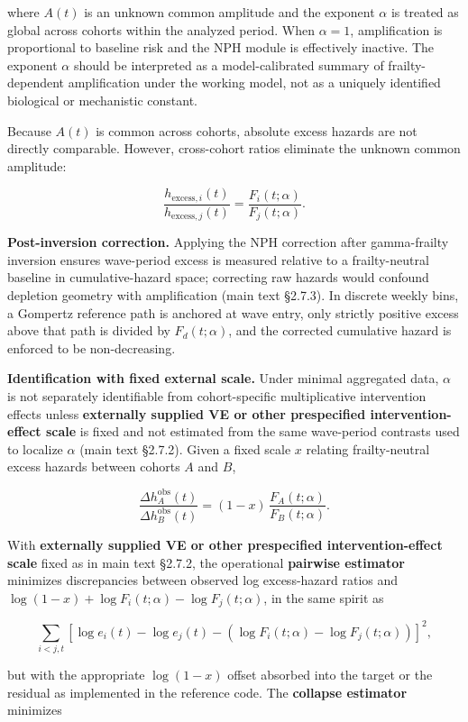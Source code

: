 \documentclass[
]{article}
\begin{document}
where \(A(t)\) is an unknown common amplitude and the exponent
\(\alpha\) is treated as global across cohorts within the analyzed
period. When \(\alpha=1\), amplification is proportional to baseline
risk and the NPH module is effectively inactive. The exponent \(\alpha\)
should be interpreted as a model-calibrated summary of frailty-dependent
amplification under the working model, not as a uniquely identified
biological or mechanistic constant.

Because \(A(t)\) is common across cohorts, absolute excess hazards are
not directly comparable. However, cross-cohort ratios eliminate the
unknown common amplitude:

\[
\frac{h_{\mathrm{excess},i}(t)}{h_{\mathrm{excess},j}(t)}
=
\frac{F_i(t;\alpha)}{F_j(t;\alpha)}.
\]

\textbf{Post-inversion correction.} Applying the NPH correction after
gamma-frailty inversion ensures wave-period excess is measured relative
to a frailty-neutral baseline in cumulative-hazard space; correcting raw
hazards would confound depletion geometry with amplification (main text
§2.7.3). In discrete weekly bins, a Gompertz reference path is anchored
at wave entry, only strictly positive excess above that path is divided
by \(F_d(t;\alpha)\), and the corrected cumulative hazard is enforced to
be non-decreasing.

\textbf{Identification with fixed external scale.} Under minimal
aggregated data, \(\alpha\) is not separately identifiable from
cohort-specific multiplicative intervention effects unless
\textbf{externally supplied VE or other prespecified intervention-effect
scale} is fixed and not estimated from the same wave-period contrasts
used to localize \(\alpha\) (main text §2.7.2). Given a fixed scale
\(x\) relating frailty-neutral excess hazards between cohorts \(A\) and
\(B\),

\[
\frac{\Delta h_A^{\mathrm{obs}}(t)}{\Delta h_B^{\mathrm{obs}}(t)}
=
(1-x)\,\frac{F_A(t;\alpha)}{F_B(t;\alpha)}.
\]

With \textbf{externally supplied VE or other prespecified
intervention-effect scale} fixed as in main text §2.7.2, the operational
\textbf{pairwise estimator} minimizes discrepancies between observed log
excess-hazard ratios and
\(\log(1-x)+\log F_i(t;\alpha)-\log F_j(t;\alpha)\), in the same spirit
as

\[
\sum_{i<j,t}
\left[
\log e_i(t)-\log e_j(t)
-\left(\log F_i(t;\alpha)-\log F_j(t;\alpha)\right)
\right]^2,
\]

but with the appropriate \(\log(1-x)\) offset absorbed into the target
or the residual as implemented in the reference code. The
\textbf{collapse estimator} minimizes
\end{document}
